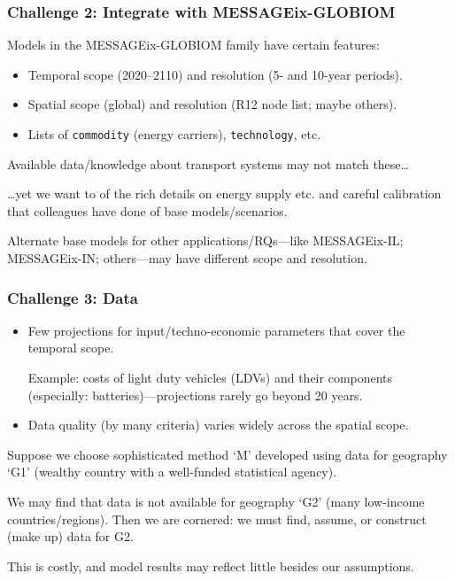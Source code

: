 \documentclass[12pt,aspectratio=169]{beamer}
\begin{document}
\begin{frame}
\frametitle{Challenge 2: Integrate with MESSAGEix-GLOBIOM}

Models in the MESSAGEix-GLOBIOM family have certain features:
\begin{itemize}
  \item Temporal scope (2020–2110) and resolution (5- and 10-year periods).
  \item Spatial scope (global) and resolution (R12 node list; maybe others).
  \item Lists of \texttt{commodity} (energy carriers), \texttt{technology}, etc.
\end{itemize}

\bigskip
Available data/knowledge about transport systems may not match these…

\bigskip
…yet we want to  of the rich details on energy supply etc. and careful calibration that colleagues have done of base models/scenarios.

\bigskip
Alternate base models for other applications/RQs—like MESSAGEix-IL; MESSAGEix-IN; others—may have different scope and resolution.
\end{frame}

\begin{frame}
\frametitle{Challenge 3: Data}
\begin{itemize}
  \item Few projections for input/techno-economic parameters that cover the temporal scope.

  {\small Example: costs of light duty vehicles (LDVs) and their components (especially: batteries)—projections rarely go beyond 20 years.}

  \item Data quality (by many criteria) varies widely across the spatial scope.
\end{itemize}

\bigskip
Suppose we choose sophisticated method ‘M’ developed using data for geography ‘G1’ (wealthy country with a well-funded statistical agency).

\bigskip
We may find that data is not available for geography ‘G2’ (many low-income countries/regions).
Then we are cornered: we must find, assume, or construct (make up) data for G2.

This is costly, and model results may reflect little besides our assumptions.
\end{frame}
\end{document}
